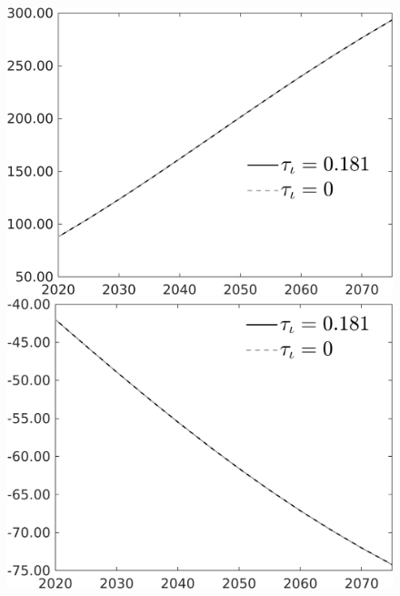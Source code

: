 \documentclass[12pt]{article}
\begin{document}
\begin{figure}[h!!]
\begin{minipage}[]{0.32\textwidth}
\end{minipage}	
	\begin{minipage}[]{0.32\textwidth}
	\includegraphics[width=1\textwidth]{../../codding_model/own_basedOnFried/optimalPol_010922_revision/figures/all_13Sept22/PerdifNoTauf_Equlab_regime0_CompTaul_wsg_spillover0_nsk1_xgr0_knspil1_sep1_LFlimit0_emsbase0_countec0_GovRev0_etaa0.79_lgd1.png}
\end{minipage}	
	\begin{minipage}[]{0.32\textwidth}
	\includegraphics[width=1\textwidth]{../../codding_model/own_basedOnFried/optimalPol_010922_revision/figures/all_13Sept22/PerdifNoTauf_Equlab_regime0_CompTaul_wsf_spillover0_nsk1_xgr0_knspil1_sep1_LFlimit0_emsbase0_countec0_GovRev0_etaa0.79_lgd1.png}
\end{minipage}	
\end{figure}
\clearpage \newpage
\end{document}
